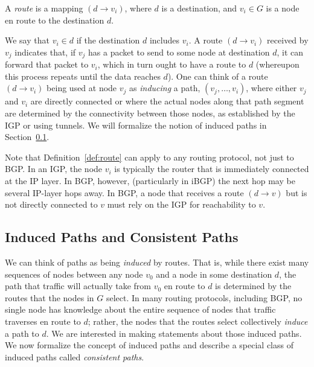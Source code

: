 \begin{defn}[Route]\label{def:route}
A {\em route} is a mapping $(d \rightarrow v_i)$, where $d$ is a
destination, and $v_i \in G$ is a node en route to the destination
$d$.  
\end{defn}
\noindent
We say that $v_i\in d$ if the destination $d$ includes $v_i$.  A route
$(d \rightarrow v_i)$ received by $v_j$ indicates that, if $v_j$ has a
packet to send to some node at destination $d$, it can forward that
packet to $v_i$, which in turn ought to have a route to $d$ (whereupon
this process repeats until the data reaches $d$).  One can think of a
route $(d \rightarrow v_i)$ being used at node $v_j$ as {\em inducing}
a path, $(v_j, \ldots, v_i)$, where either $v_j$ and $v_i$ are directly
connected or where the actual nodes along that path segment are
determined by the connectivity between those nodes, as established by the
IGP or using tunnels.  We will formalize the notion of induced paths in
Section~\ref{sec:consistency}.

Note that Definition~\ref{def:route} can apply to any routing protocol,
not just to BGP.  In an IGP, the node $v_i$ is typically the router that is
immediately connected at the IP layer.  In BGP, however, (particularly
in iBGP) the next hop may be several IP-layer hops away.  In
BGP, a node that receives a route $(d \rightarrow v)$ but is not
directly connected to $v$ must rely on the IGP for reachability to $v$.

\subsection{Induced Paths and Consistent Paths}\label{sec:consistency}

We can think of paths as being {\em induced} by routes.  That is, while
there exist many sequences of nodes between any node $v_0$ and a node in some
destination $d$, the path that traffic will actually take from $v_0$ en
route to $d$ is determined by the routes that the nodes in $G$ select.
In many routing protocols, including BGP, no single node has knowledge
about the entire sequence of nodes that traffic traverses en route to
$d$; rather, the
nodes that the routes select collectively {\em induce} a path to $d$.  We are
interested in making statements about those induced paths.  We now
formalize the concept of induced paths and describe a special class of
induced paths called {\em consistent paths}.


